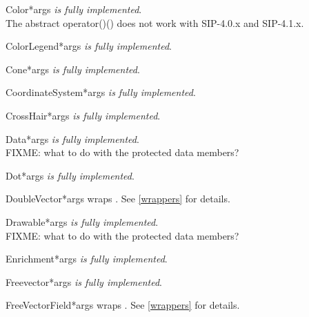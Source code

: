 \documentclass{manual}
\begin{document}
\begin{classdesc}{Color}{*args}
\emph{is fully implemented}.\\
The abstract operator()() does not work with SIP-4.0.x and SIP-4.1.x.
\end{classdesc}

\begin{classdesc}{ColorLegend}{*args}
\emph{is fully implemented}.
\end{classdesc}

\begin{classdesc}{Cone}{*args}
\emph{is fully implemented}.
\end{classdesc}

\begin{classdesc}{CoordinateSystem}{*args}
\emph{is fully implemented}.
\end{classdesc}

\begin{classdesc}{CrossHair}{*args}
\emph{is fully implemented}.
\end{classdesc}

\begin{classdesc}{Data}{*args}
\emph{is fully implemented}.\\
FIXME: what to do with the protected data members?
\end{classdesc}

\begin{classdesc}{Dot}{*args}
\emph{is fully implemented}.
\end{classdesc}

\begin{classdesc}{DoubleVector}{*args}
wraps . See \ref{wrappers} for details.
\end{classdesc}

\begin{classdesc}{Drawable}{*args}
\emph{is fully implemented}.\\
FIXME: what to do with the protected data members?
\end{classdesc}

\begin{classdesc}{Enrichment}{*args}
\emph{is fully implemented}.
\end{classdesc}

\begin{classdesc}{Freevector}{*args}
\emph{is fully implemented}.
\end{classdesc}

\begin{classdesc}{FreeVectorField}{*args}
wraps . See \ref{wrappers} for details.
\end{classdesc}
\end{document}
